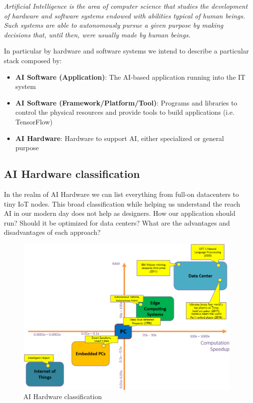 \documentclass{article}
\begin{document}
    \emph{Artificial Intelligence is the area of computer science that studies the development of hardware and 
    software systems endowed with abilities typical of human beings. Such systems are able to autonomously pursue 
    a given purpose by making decisions that, until then, were usually made by human beings.}

    In particular by hardware and software systems we intend to describe a particular stack composed by:
    \begin{itemize}
      \item \textbf{AI Software (Application)}: The AI-based application running into the IT system
      \item \textbf{AI Software (Framework/Platform/Tool)}: Programs and libraries to control the physical resources and provide tools to build applications (i.e. TensorFlow)
      \item \textbf{AI Hardware}: Hardware to support AI, either specialized or general purpose
    \end{itemize}

    \subsection{AI Hardware classification}
      In the realm of AI Hardware we can list everything from full-on datacenters to tiny IoT nodes. This broad classification while helping us understand the
      reach AI in our modern day does not help as designers. How our application should run? Should it be optimized for data centers? What are the
      advantages and disadvantages of each approach?

      \begin{figure}[H]
        \includegraphics[scale=0.3]{../Images/HWforAI.png}
        \centering
        \caption{AI Hardware classification}
      \end{figure}
\end{document}
